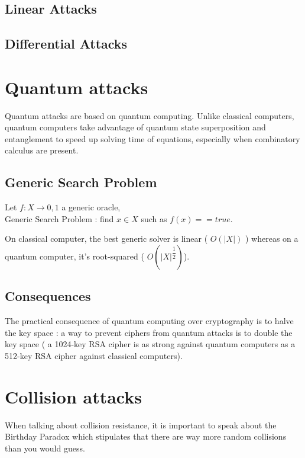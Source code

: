 \subsection{Linear Attacks}
\subsection{Differential Attacks}


\section{Quantum attacks}

Quantum attacks are based on quantum computing. Unlike classical computers, quantum computers take advantage of quantum state superposition and entanglement to speed up solving time of equations, especially when combinatory calculus are present.

\subsection{ Generic Search Problem}

\begin{mydef}
\begin{minipage}[t]{0.8\textwidth}
    Let $f : X \rightarrow {0,1}$ a generic oracle, \\
  	Generic Search Problem : find $x \in X$ such as $ f(x) == true $.
\end{minipage}
\end{mydef}

On classical computer, the best generic solver is linear ( $O(|X|)$ ) whereas on a quantum computer, it's root-squared ( $O(|X|^{\dfrac{1}{2}})$).

\subsection{ Consequences } 
The practical consequence of quantum computing over cryptography is to halve the key space : a way to prevent ciphers from quantum attacks is to double the key space ( a 1024-key RSA cipher is as strong against quantum computers as a 512-key RSA cipher against classical computers).


\section{Collision attacks}

When talking about collision resistance, it is important to speak about the Birthday Paradox which stipulates that there are way more random collisions than you would guess.

